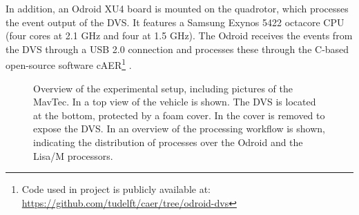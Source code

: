 In addition, an Odroid XU4 board is mounted on the quadrotor, which processes the event output of the DVS. It features a Samsung Exynos 5422 octacore CPU (four cores at 2.1 GHz and four at 1.5 GHz). The Odroid receives the events from the DVS through a USB 2.0 connection and processes these through the C-based open-source software cAER\footnote{Code used in project is publicly available at: \url{https://github.com/tudelft/caer/tree/odroid-dvs}} \cite{Longinotti2014}. 


\begin{figure*}[!ht]
	\centering
	\begin{framed}
		\begin{minipage}[c]{0.3\textwidth}
			\centering
		\par\vfill
		\end{minipage}\hfill
		\begin{minipage}[c]{0.67\textwidth}
		\end{minipage}
		\caption{Overview of the experimental setup, including pictures of the MavTec. In \protect{} a top view of the vehicle is shown. The DVS is located at the bottom, protected by a foam cover. In \protect{} the cover is removed to expose the DVS. In \protect{} an overview of the processing workflow is shown, indicating the distribution of processes over the Odroid and the Lisa/M processors.}
		\label{fig:mavtec}
	\end{framed}
\end{figure*}

